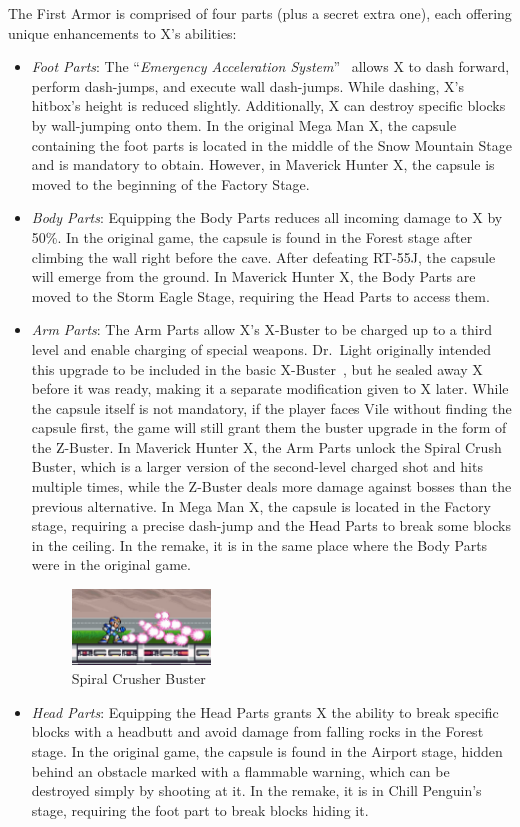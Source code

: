 The First Armor is comprised of four parts (plus a secret extra one), each offering unique enhancements to X's abilities:
\begin{itemize}
\item \emph{Foot Parts}: The ``\textit{Emergency Acceleration System}''~\cite{X:Manual} allows X to dash forward, perform dash-jumps, and execute wall dash-jumps. While dashing, X's hitbox's height is reduced slightly. Additionally, X can destroy specific blocks by wall-jumping onto them. In the original Mega Man X, the capsule containing the foot parts is located in the middle of the Snow Mountain Stage and is mandatory to obtain. However, in Maverick Hunter X, the capsule is moved to the beginning of the Factory Stage.

\item \emph{Body Parts}: Equipping the Body Parts reduces all incoming damage to X by 50\%. In the original game, the capsule is found in the Forest stage after climbing the wall right before the cave. After defeating RT-55J, the capsule will emerge from the ground. In Maverick Hunter X, the Body Parts are moved to the Storm Eagle Stage, requiring the Head Parts to access them.

\item \emph{Arm Parts}: The Arm Parts allow X's X-Buster to be charged up to a third level and enable charging of special weapons. Dr.~Light originally intended this upgrade to be included in the basic X-Buster~\cite{X:Manual}, but he sealed away X before it was ready, making it a separate modification given to X later. While the capsule itself is not mandatory, if the player faces Vile without finding the capsule first, the game will still grant them the buster upgrade in the form of the Z-Buster. In Maverick Hunter X, the Arm Parts unlock the Spiral Crush Buster, which is a larger version of the second-level charged shot and hits multiple times, while the Z-Buster deals more damage against bosses than the previous alternative. In Mega Man X, the capsule is located in the Factory stage, requiring a precise dash-jump and the Head Parts to break some blocks in the ceiling. In the remake, it is in the same place where the Body Parts were in the original game.
\begin{figure}[htp]
	\centering
	\includegraphics[height=2cm]{figures/X1/weapons/Buster_4.jpg}
	\caption{Spiral Crusher Buster}
\end{figure}
\item \emph{Head Parts}: Equipping the Head Parts grants X the ability to break specific blocks with a headbutt and avoid damage from falling rocks in the Forest stage. In the original game, the capsule is found in the Airport stage, hidden behind an obstacle marked with a flammable warning, which can be destroyed simply by shooting at it. In the remake, it is in Chill Penguin's stage, requiring the foot part to break blocks hiding it.


\end{itemize}
